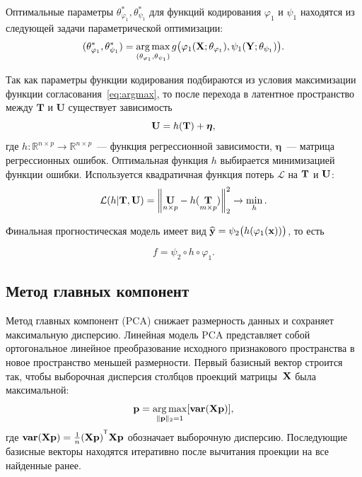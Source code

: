 Оптимальные параметры $\theta_{\varphi_1}^{*}, \theta_{\psi_1}^{*}$ для функций кодирования $\varphi_1$  и $\psi_1$ находятся из следующей задачи параметрической оптимизации:
\begin{equation}
	(\theta_{\varphi_1}^{*}, \theta_{\psi_1}^{*}) = \mathop{\arg \max}\limits_{(\theta_{\varphi_1}, \theta_{\psi_1})} g\bigl( \varphi_1(\mathbf{X}; \theta_{\varphi_1}), \psi_1(\mathbf{Y}; \theta_{\psi_1})\bigr).
\label{eq:argmax}
\end{equation}

Так как параметры функции кодирования подбираются из условия максимизации функции согласования~\eqref{eq:argmax}, то после перехода в латентное пространство между $\mathbf{T}$ и $\mathbf{U}$ существует зависимость
\begin{equation}
	\mathbf{U} = h(\mathbf{T}) +  \boldsymbol{\eta},
	\label{eq:reg2}
\end{equation}
где $h: \mathbb{R}^{n \times p} \to \mathbb{R}^{n \times p}$~--- функция регрессионной зависимости,  $\boldsymbol{\eta}$~--- матрица регрессионных ошибок.
Оптимальная функция $h$ выбирается минимизацией функции ошибки. Используется квадратичная функция потерь $\mathcal{L}$ на $\mathbf{T}$ и $\mathbf{U}$:
\begin{equation}
	\mathcal{L}(h | {\mathbf{T}}, {\mathbf{U}}) = {\left\| \underset{n \times p}{\mathbf{U}}  - h(\underset{m \times p}{\mathbf{T}}) \right\| }_2^2 \rightarrow\min_{h}.
	\label{eq:loss_function}
\end{equation}

Финальная прогностическая модель имеет вид
$\widehat{\mathbf{y}} = \psi_2\bigl(h(\varphi_1(\mathbf{x}))\bigr)$, то есть

\begin{equation}
	f = \psi_2 \circ h \circ \varphi_1.
	\label{eq:f}
\end{equation}

\subsection{Метод главных компонент}

Метод главных компонент (PCA) снижает размерность данных и сохраняет максимальную дисперсию. Линейная модель PCA представляет собой ортогональное линейное преобразование исходного признакового пространства в новое пространство меньшей размерности. Первый базисный вектор строится так, чтобы выборочная дисперсия столбцов проекций матрицы~$\mathbf{X}$ была максимальной:
\begin{equation}
	\mathbf{p} = \mathop{\arg \max}\limits_{\|\mathbf{p}\|_{2} = 1} [\textbf{var}(\mathbf{X} \textbf{p})],
	\label{eq:PCA}
\end{equation}
где $\textbf{var}(\bX \textbf{p}) = \frac{1}{n} (\bX \textbf{p})^{\T}\bX \textbf{p}$ обозначает выборочную дисперсию. Последующие базисные векторы находятся итеративно после вычитания проекции на все найденные ранее.


